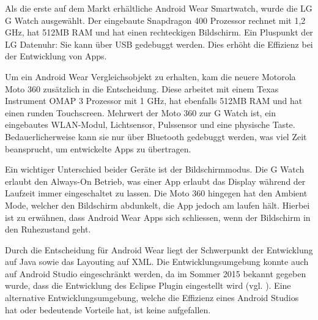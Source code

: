 Als die erste auf dem Markt erhältliche Android Wear Smartwatch, wurde die LG G Watch ausgewählt. Der eingebaute Snapdragon 400 Prozessor rechnet mit 1,2 \gls{GHz}, hat 512\gls{MB} \gls{RAM} und hat einen rechteckigen Bildschirm. Ein Pluspunkt der LG Datenuhr: Sie kann über USB gedebuggt werden. Dies erhöht die Effizienz bei der Entwicklung von Apps.

Um ein Android Wear Vergleichsobjekt zu erhalten, kam die neuere Motorola Moto 360 zusätzlich in die Entscheidung. Diese arbeitet mit einem Texas Instrument OMAP 3 Prozessor mit 1 \gls{GHz}, hat ebenfalls 512\gls{MB} \gls{RAM} und hat einen runden Touchscreen. Mehrwert der Moto 360 zur G Watch ist, ein eingebautes \gls{WLAN}-Modul, Lichtsensor, Pulssensor und eine physische Taste. Bedauerlicherweise kann sie nur über Bluetooth gedebuggt werden, was viel Zeit beansprucht, um entwickelte Apps zu übertragen.

Ein wichtiger Unterschied beider Geräte ist der Bildschirmmodus. Die G Watch erlaubt den Always-On Betrieb, was einer App erlaubt das Display während der Laufzeit immer eingeschaltet zu lassen. Die Moto 360 hingegen hat den Ambient Mode, welcher den Bildschirm abdunkelt, die App jedoch am laufen hält. Hierbei ist zu erwähnen, dass Android Wear Apps sich schliessen, wenn der Bildschirm in den Ruhezustand geht.

Durch die Entscheidung für Android Wear liegt der Schwerpunkt der Entwicklung auf Java sowie das Layouting auf \gls{XML}. Die Entwicklungsumgebung konnte auch auf Android Studio eingeschränkt werden, da im Sommer 2015 bekannt gegeben wurde, dass die Entwicklung des Eclipse Plugin eingestellt wird (vgl. \cite{adbl:eadt}). Eine alternative Entwicklungsumgebung, welche die Effizienz eines Android Studios hat oder bedeutende Vorteile hat, ist keine aufgefallen.
